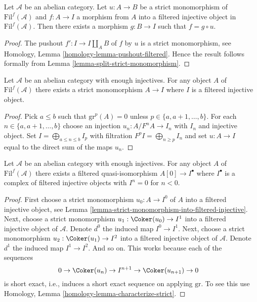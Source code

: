 \begin{lemma}
\label{lemma-injective-property-filtered-injective}
Let $\mathcal{A}$ be an abelian category.
Let $u : A \to B$ be a strict monomorphism
of $\text{Fil}^f(\mathcal{A})$
and $f : A \to I$ a morphism from $A$ into a filtered injective object
in $\text{Fil}^f(\mathcal{A})$.
Then there exists a morphism $g : B \to I$ such that $f = g \circ u$.
\end{lemma}

\begin{proof}
The pushout $f' : I \to I \amalg_A B$ of $f$ by $u$ is a strict
monomorphism, see
Homology, Lemma \ref{homology-lemma-pushout-filtered}.
Hence the result follows formally from
Lemma \ref{lemma-split-strict-monomorphism}.
\end{proof}

\begin{lemma}
\label{lemma-strict-monomorphism-into-filtered-injective}
Let $\mathcal{A}$ be an abelian category with enough injectives.
For any object $A$ of $\text{Fil}^f(\mathcal{A})$ there exists
a strict monomorphism $A \to I$
where $I$ is a filtered injective object.
\end{lemma}

\begin{proof}
Pick $a \leq b$ such that $\text{gr}^p(A) = 0$ unless
$p \in \{a, a + 1, \ldots, b\}$. For each
$n \in \{a, a + 1, \ldots, b\}$ choose an injection
$u_n : A/F^nA \to I_n$ with $I_n$ and injective object.
Set $I = \bigoplus_{a \leq n \leq b} I_p$ with filtration
$F^pI = \bigoplus_{n \geq p} I_n$ and set $u : A \to I$ equal to
the direct sum of the maps $u_n$.
\end{proof}

\begin{lemma}
\label{lemma-filtered-injective-right-resolution-single-object}
Let $\mathcal{A}$ be an abelian category with enough injectives.
For any object $A$ of $\text{Fil}^f(\mathcal{A})$ there exists
a filtered quasi-isomorphism $A[0] \to I^\bullet$
where $I^\bullet$ is a complex of filtered injective objects
with $I^n = 0$ for $n < 0$.
\end{lemma}

\begin{proof}
First choose a strict monomorphism $u_0 : A \to I^0$ of $A$ into a filtered
injective object, see
Lemma \ref{lemma-strict-monomorphism-into-filtered-injective}.
Next, choose a strict monomorphism
$u_1 : \Coker(u_0) \to I^1$ into a filtered injective object of
$\mathcal{A}$. Denote $d^0$ the induced map $I^0 \to I^1$.
Next, choose a strict monomorphism $u_2 : \Coker(u_1) \to I^2$ into
a filtered injective object of $\mathcal{A}$. Denote $d^1$ the induced
map $I^1 \to I^2$. And so on. This works because each
of the sequences
$$
0 \to \Coker(u_n) \to I^{n + 1} \to \Coker(u_{n + 1}) \to 0
$$
is short exact, i.e., induces a short exact sequence on applying
$\text{gr}$. To see this use
Homology, Lemma \ref{homology-lemma-characterize-strict}.
\end{proof}

